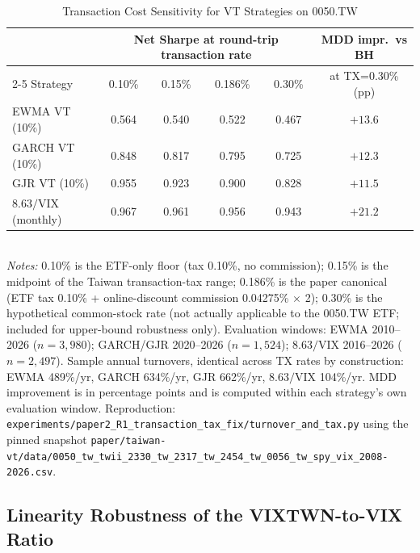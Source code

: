 \begin{table}[!htbp]
\centering
\caption{Transaction Cost Sensitivity for VT Strategies on 0050.TW}
\label{tab:tx_sensitivity}
\small
\begin{tabular}{lccccc}
\toprule
& \multicolumn{4}{c}{Net Sharpe at round-trip transaction rate} & MDD impr.\ vs BH \\
\cmidrule(lr){2-5}
Strategy & 0.10\% & 0.15\% & 0.186\% & 0.30\% & at TX=0.30\% (pp) \\
\midrule
EWMA VT (10\%)        & 0.564 & 0.540 & 0.522 & 0.467 & $+13.6$ \\
GARCH VT (10\%)       & 0.848 & 0.817 & 0.795 & 0.725 & $+12.3$ \\
GJR VT (10\%)         & 0.955 & 0.923 & 0.900 & 0.828 & $+11.5$ \\
$8.63/\text{VIX}$ (monthly) & 0.967 & 0.961 & 0.956 & 0.943 & $+21.2$ \\
\bottomrule
\end{tabular}
\smallskip
\\
\small \textit{Notes:} 0.10\% is the ETF-only floor (tax 0.10\%, no commission); 0.15\%
is the midpoint of the Taiwan transaction-tax range; 0.186\% is the paper canonical (ETF
tax 0.10\% + online-discount commission 0.04275\% $\times$ 2); 0.30\% is the
hypothetical common-stock rate (not actually applicable to the 0050.TW ETF; included
for upper-bound robustness only). Evaluation windows: EWMA 2010--2026
($n=3{,}980$); GARCH/GJR 2020--2026 ($n=1{,}524$); $8.63/\text{VIX}$ 2016--2026
($n=2{,}497$). Sample annual turnovers, identical across TX rates by construction:
EWMA 489\%/yr, GARCH 634\%/yr, GJR 662\%/yr, $8.63/\text{VIX}$ 104\%/yr. MDD improvement
is in percentage points and is computed within each strategy's own evaluation window.
Reproduction: \texttt{experiments/paper2\_R1\_transaction\_tax\_fix/turnover\_and\_tax.py}
using the pinned snapshot \texttt{paper/taiwan-vt/data/0050\_tw\_twii\_2330\_tw\_2317\_tw\_2454\_tw\_0056\_tw\_spy\_vix\_2008-2026.csv}.
\end{table}

\subsection{Linearity Robustness of the VIXTWN-to-VIX Ratio}\label{sec:vixtwn_ratio_linearity}

